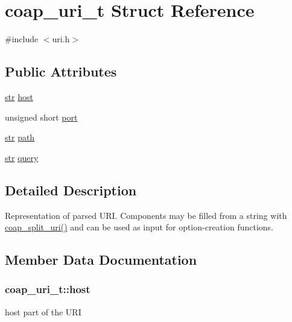 \hypertarget{structcoap__uri__t}{}\section{coap\+\_\+uri\+\_\+t Struct Reference}
\label{structcoap__uri__t}


{\ttfamily \#include $<$uri.\+h$>$}

\subsection*{Public Attributes}
\begin{DoxyCompactItemize}
\item 
\hyperlink{structstr}{str} \hyperlink{structcoap__uri__t_a8259e330f511348f33532739930f7dad}{host}
\item 
unsigned short \hyperlink{structcoap__uri__t_a032197612d4eea039f5bf690b074998c}{port}
\item 
\hyperlink{structstr}{str} \hyperlink{structcoap__uri__t_ac6a10f366eb52282158abd163b2443b9}{path}
\item 
\hyperlink{structstr}{str} \hyperlink{structcoap__uri__t_ac0650ecfdcd7e5f7ba8142fbffba6068}{query}
\end{DoxyCompactItemize}


\subsection{Detailed Description}
Representation of parsed U\+R\+I. Components may be filled from a string with \hyperlink{group__uri__parse_gad92e0061b8752f304053f59f9da8b62d}{coap\+\_\+split\+\_\+uri()} and can be used as input for option-\/creation functions. 

\subsection{Member Data Documentation}
\hypertarget{structcoap__uri__t_a8259e330f511348f33532739930f7dad}{}
\subsubsection[{host}]{ coap\+\_\+uri\+\_\+t\+::host}\label{structcoap__uri__t_a8259e330f511348f33532739930f7dad}
host part of the U\+R\+I \hypertarget{structcoap__uri__t_ac6a10f366eb52282158abd163b2443b9}{}
